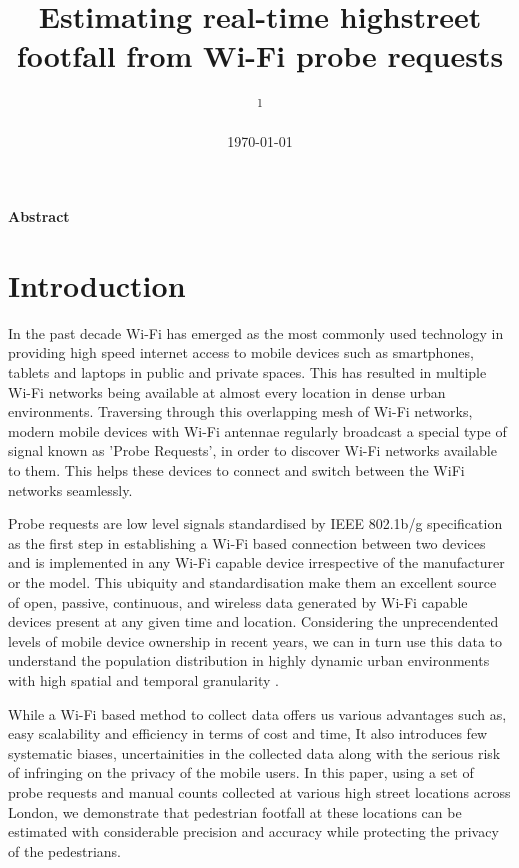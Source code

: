 \documentclass[11t, a4paper, twocolumn]{article}
\title{Estimating real-time highstreet  footfall from Wi-Fi probe requests}
\author{
	\authorstyle{
		Balamurugan Soundararaj\textsuperscript{1}, 
		James Cheshire\textsuperscript{1} and 
		Paul Longley\textsuperscript{1}}
	\newline\newline
	\textsuperscript{1}\institution{
		Department of Geography, 
		University College London, 
		United Kingdom}
}
\date{\today}
\begin{document}
	\maketitle
	\thispagestyle{firstpage}
	
	\textbf{Abstract } \lipsum[1]

	\section{Introduction}\label{intro}

		In the past decade Wi-Fi has emerged as the most commonly used technology in providing high speed internet access to mobile devices such as smartphones, tablets and laptops in public and private spaces. This has resulted in multiple Wi-Fi networks being available at almost every location in dense urban environments. Traversing through this overlapping mesh of Wi-Fi networks, modern mobile devices with Wi-Fi antennae regularly broadcast a special type of signal known as 'Probe Requests', in order to discover Wi-Fi networks available to them. This helps these devices to connect and switch between the WiFi networks seamlessly.
		
		Probe requests are low level signals standardised by IEEE 802.1b/g specification as the first step in establishing a Wi-Fi based connection between two devices and is implemented in any Wi-Fi capable device irrespective of the manufacturer or the model. This ubiquity and standardisation make them an excellent source of open, passive, continuous, and wireless data generated by Wi-Fi capable devices present at any given time and location. Considering the unprecendented levels of mobile device ownership in recent years, we can in turn use this data to understand the population distribution in highly dynamic urban environments with high spatial and temporal granularity \citep{freud2015,konto2017}.

		While a Wi-Fi based method to collect data offers us various advantages such as, easy scalability and efficiency in terms of cost and time, It also introduces few systematic biases, uncertainities in the collected data along with the serious risk of infringing on the privacy of the mobile users. In this paper, using a set of probe requests and manual counts collected at various high street locations across London, we demonstrate that pedestrian footfall at these locations can be estimated with considerable precision and accuracy while protecting the privacy of the pedestrians.
\end{document}
